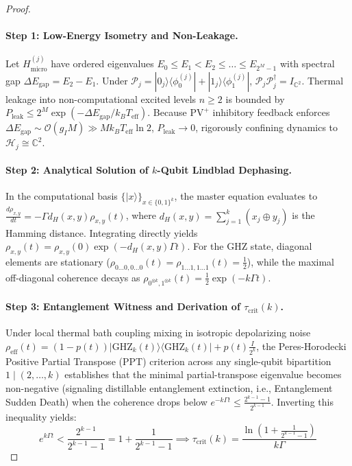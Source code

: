\documentclass[10pt,twocolumn,3p]{article}
\begin{document}
\begin{proof}
\paragraph{Step 1: Low-Energy Isometry and Non-Leakage.}
Let $H_{\text{micro}}^{(j)}$ have ordered eigenvalues $E_0 \le E_1 < E_2 \le \dots \le E_{2^M-1}$ with spectral gap $\Delta E_{\text{gap}} = E_2 - E_1$. Under $\mathcal{P}_j = |0_j\rangle\langle \phi_0^{(j)}| + |1_j\rangle\langle \phi_1^{(j)}|$, $\mathcal{P}_j \mathcal{P}_j^\dagger = I_{\mathbb{C}^2}$. Thermal leakage into non-computational excited levels $n \ge 2$ is bounded by $P_{\text{leak}} \le 2^M \exp(-\Delta E_{\text{gap}} / k_B T_{\text{eff}})$. Because $\text{PV}^+$ inhibitory feedback enforces $\Delta E_{\text{gap}} \sim \mathcal{O}(g_I M) \gg M k_B T_{\text{eff}} \ln 2$, $P_{\text{leak}} \to 0$, rigorously confining dynamics to $\mathcal{H}_j \cong \mathbb{C}^2$.

\paragraph{Step 2: Analytical Solution of $k$-Qubit Lindblad Dephasing.}
In the computational basis $\{|x\rangle\}_{x \in \{0,1\}^k}$, the master equation evaluates to $\frac{d\rho_{x,y}}{dt} = -\Gamma d_H(x, y) \rho_{x,y}(t)$, where $d_H(x, y) = \sum_{j=1}^k (x_j \oplus y_j)$ is the Hamming distance. Integrating directly yields $\rho_{x,y}(t) = \rho_{x,y}(0) \exp(-d_H(x, y) \Gamma t)$. For the GHZ state, diagonal elements are stationary ($\rho_{0\dots 0, 0\dots 0}(t) = \rho_{1\dots 1, 1\dots 1}(t) = \frac{1}{2}$), while the maximal off-diagonal coherence decays as $\rho_{0^{\otimes k}, 1^{\otimes k}}(t) = \frac{1}{2} \exp(-k \Gamma t)$.

\paragraph{Step 3: Entanglement Witness and Derivation of $\tau_{\text{crit}}(k)$.}
Under local thermal bath coupling mixing in isotropic depolarizing noise $\rho_{\text{eff}}(t) = (1 - p(t)) |\text{GHZ}_k(t)\rangle\langle\text{GHZ}_k(t)| + p(t) \frac{I}{2^k}$, the Peres-Horodecki Positive Partial Transpose (PPT) criterion across any single-qubit bipartition $1 \mid (2, \dots, k)$ establishes that the minimal partial-transpose eigenvalue becomes non-negative (signaling distillable entanglement extinction, i.e., Entanglement Sudden Death) when the coherence drops below $e^{-k \Gamma t} \le \frac{2^{k-1} - 1}{2^{k-1}}$. Inverting this inequality yields:
\begin{equation}
    e^{k \Gamma t} < \frac{2^{k-1}}{2^{k-1} - 1} = 1 + \frac{1}{2^{k-1} - 1} \implies \tau_{\text{crit}}(k) = \frac{\ln\left(1 + \frac{1}{2^{k-1}-1}\right)}{k \Gamma}
\end{equation}


\end{proof}
\end{document}
